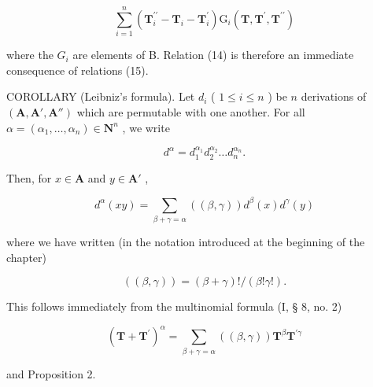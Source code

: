 \[
\sum_ {i = 1} ^ {n} \left(\mathbf {T} _ {i} ^ {\prime \prime} - \mathbf {T} _ {i} - \mathbf {T} _ {i} ^ {\prime}\right) \mathrm{G} _ {i} (\mathbf {T}, \mathbf {T} ^ {\prime}, \mathbf {T} ^ {\prime \prime})
\]

where the \(G_{i}\) are elements of B. Relation (14) is therefore an immediate consequence of relations (15).

COROLLARY (Leibniz's formula). Let \(d_{i}\) ( \(1 \leqslant i \leqslant n\) ) be \(n\) derivations of \((\mathbf{A}, \mathbf{A}', \mathbf{A}'' )\) which are permutable with one another. For all \(\alpha = (\alpha_{1}, \ldots, \alpha_{n}) \in \mathbf{N}^{n}\) , we write

\[
d ^ {\alpha} = d _ {1} ^ {\alpha_ {1}} d _ {2} ^ {\alpha_ {2}} \dots d _ {n} ^ {\alpha_ {n}}.\tag{16}
\]

Then, for \(x \in \mathbf{A}\) and \(y \in \mathbf{A}'\) ,

\[
d ^ {\alpha} (x y) = \sum_ {\beta + \gamma = \alpha} ((\beta , \gamma)) d ^ {\beta} (x) d ^ {\gamma} (y)\tag{17}
\]

where we have written (in the notation introduced at the beginning of the chapter)

\[
((\beta , \gamma)) = (\beta + \gamma)! / (\beta ! \gamma!).\tag{18}
\]

This follows immediately from the multinomial formula (I, § 8, no. 2)

\[
(\mathbf {T} + \mathbf {T} ^ {\prime}) ^ {\alpha} = \sum_ {\beta + \gamma = \alpha} ((\beta , \gamma)) \mathbf {T} ^ {\beta} \mathbf {T} ^ {\prime \gamma}
\]

and Proposition 2.

